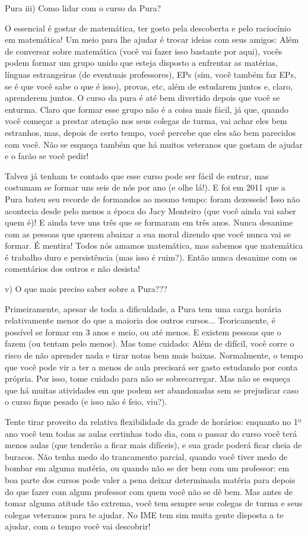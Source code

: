 \begin{subsecao}{Pura}
iii) Como lidar com o curso da Pura?

O essencial é gostar de matemática, ter gosto pela descoberta e pelo raciocínio em matemática! Um meio para lhe ajudar é trocar ideias com seus amigos: Além de conversar sobre matemática (você vai fazer isso bastante por aqui), vocês podem formar um grupo unido que esteja
disposto a enfrentar as matérias, línguas estrangeiras (de eventuais
professores), EPs (sim, você também faz EPs, se é que você sabe o que é isso),
provas, etc, além de estudarem juntos e, claro, aprenderem juntos. O curso da pura
é até bem divertido depois que você se enturma. Claro que
formar esse grupo não é a coisa mais fácil, já que, quando você começar a
prestar atenção nos seus colegas de turma, vai achar eles bem estranhos, mas,
depois de certo tempo, você percebe que eles são bem parecidos com você. Não se esqueça também que há muitos veteranos que gostam de ajudar e o farão se você pedir!

Talvez já tenham te contado que esse curso pode ser fácil de entrar, mas
costumam se formar uns seis de nós por ano (e olhe lá!). E foi em 2011 que a Pura bateu seu recorde de formandos ao mesmo tempo:
foram dezesseis! Isso não acontecia desde pelo menos a época do Jacy Monteiro (que
você ainda vai saber quem é)! E ainda teve uns três que se formaram em
três anos. Nunca desanime com as pessoas que querem abaixar a sua moral dizendo que você nunca vai se formar. É mentira! Todos nós amamos matemática, mas sabemos que matemática é trabalho duro e persistência (mas isso é ruim?). Então nunca desanime com os comentários dos outros e não desista!

v) O que mais preciso saber sobre a Pura???

Primeiramente, apesar de toda a dificuldade, a Pura tem uma carga horária
relativamente menor do que a maioria dos outros cursos... Teoricamente, é
possível se formar em 3 anos e meio, ou até menos. E existem pessoas que o
fazem (ou tentam pelo menos). Mas tome cuidado: Além de difícil, você
corre o risco de não aprender nada e tirar notas bem mais baixas. Normalmente,
o tempo que você pode vir a ter a menos de aula precisará ser gasto estudando
por conta própria. Por isso, tome cuidado para não se sobrecarregar. Mas não se esqueça que há muitas atividades em que podem ser abandonadas sem se prejudicar  caso o curso fique pesado (e isso não é feio, viu?).

Tente tirar proveito da relativa flexibilidade da grade de horários: enquanto
no 1º ano você tem todas as aulas certinhas todo dia, com o passar do
curso você terá menos aulas (que tenderão a ficar mais difíceis), e sua
grade poderá ficar cheia de buracos. Não tenha medo do trancamento parcial,
quando você tiver medo de bombar em alguma matéria, ou quando não se der bem com
um professor: em boa parte dos cursos pode valer a pena deixar determinada
matéria para depois do que fazer com algum professor com quem você não se dê
bem. Mas antes de tomar alguma atitude tão extrema, você tem sempre seus colegas de turma e seus colegas veteranos para te ajudar. No IME tem sim muita gente disposta a te ajudar, com o tempo você vai descobrir!


\end{subsecao}

